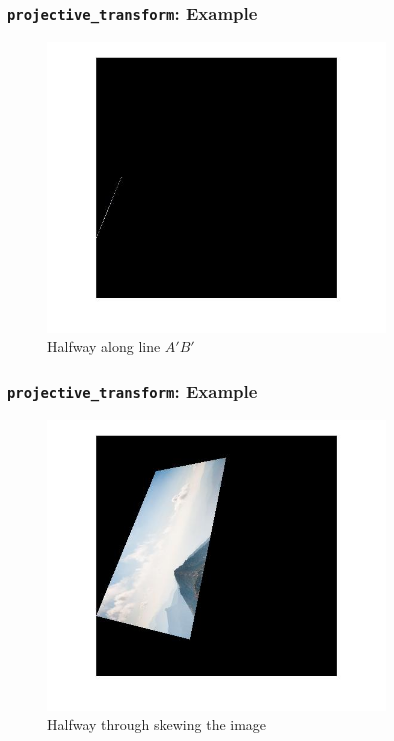 \documentclass{beamer}
\begin{document}
\begin{frame}
	\frametitle{{\tt projective\_transform}: Example}
	\begin{figure}
		\centering
		\includegraphics[width=0.8\textwidth]{images/skew_example/projected_halfway_line.jpg}
		\caption{Halfway along line $A\prime B\prime$}
	\end{figure}
\end{frame}

\begin{frame}
	\frametitle{{\tt projective\_transform}: Example}
	\begin{figure}
		\centering
		\includegraphics[width=0.8\textwidth]{images/skew_example/projected_halfway.jpg}
		\caption{Halfway through skewing the image}
	\end{figure}
\end{frame}
\end{document}
